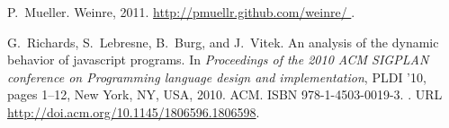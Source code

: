 \documentclass[10pt]{sigplanconf}
\begin{document}
\begin{thebibliography}{27}
P.~Mueller.
\newblock Weinre, 2011.
\newblock \url{http://pmuellr.github.com/weinre/ }.

G.~Richards, S.~Lebresne, B.~Burg, and J.~Vitek.
\newblock An analysis of the dynamic behavior of javascript programs.
\newblock In \emph{Proceedings of the 2010 ACM SIGPLAN conference on
  Programming language design and implementation}, PLDI '10, pages 1--12, New
  York, NY, USA, 2010. ACM.
\newblock ISBN 978-1-4503-0019-3.
\newblock {}.
\newblock URL \url{http://doi.acm.org/10.1145/1806596.1806598}.

\end{thebibliography}
\end{document}
